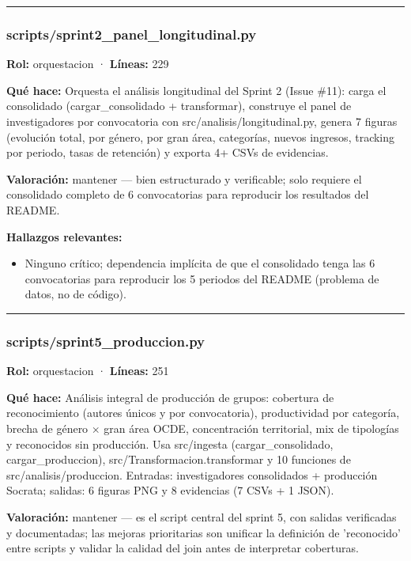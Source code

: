\medskip
\hrule

\subsubsection{scripts/sprint2\_panel\_longitudinal.py}
\textbf{Rol:} orquestacion · \textbf{Líneas:} 229

\textbf{Qué hace:} Orquesta el análisis longitudinal del Sprint 2 (Issue \#11): carga el consolidado (cargar\_consolidado + transformar), construye el panel de investigadores por convocatoria con src/analisis/longitudinal.py, genera 7 figuras (evolución total, por género, por gran área, categorías, nuevos ingresos, tracking por periodo, tasas de retención) y exporta 4+ CSVs de evidencias.

\textbf{Valoración:} mantener --- bien estructurado y verificable; solo requiere el consolidado completo de 6 convocatorias para reproducir los resultados del README.

\textbf{Hallazgos relevantes:}
\begin{itemize}
  \item Ninguno crítico; dependencia implícita de que el consolidado tenga las 6 convocatorias para reproducir los 5 periodos del README (problema de datos, no de código).
\end{itemize}

\medskip
\hrule

\subsubsection{scripts/sprint5\_produccion.py}
\textbf{Rol:} orquestacion · \textbf{Líneas:} 251

\textbf{Qué hace:} Análisis integral de producción de grupos: cobertura de reconocimiento (autores únicos y por convocatoria), productividad por categoría, brecha de género $\times$ gran área OCDE, concentración territorial, mix de tipologías y reconocidos sin producción. Usa src/ingesta (cargar\_consolidado, cargar\_produccion), src/Transformacion.transformar y 10 funciones de src/analisis/produccion. Entradas: investigadores consolidados + producción Socrata; salidas: 6 figuras PNG y 8 evidencias (7 CSVs + 1 JSON).

\textbf{Valoración:} mantener --- es el script central del sprint 5, con salidas verificadas y documentadas; las mejoras prioritarias son unificar la definición de 'reconocido' entre scripts y validar la calidad del join antes de interpretar coberturas.

